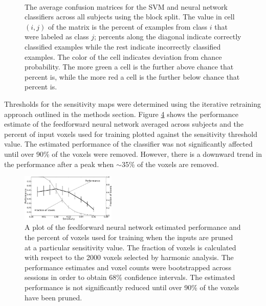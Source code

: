 \documentclass[review,1p,authoryear]{elsarticle}
\begin{document}
\begin{figure}
\centering
\begin{subfigure}{0.3\textwidth}
\centering
\begin{adjustbox}{center}

\end{adjustbox}
\caption{}
\label{fig:average-confusion-svm}
\end{subfigure}
\\
\begin{subfigure}{0.3\textwidth}
\centering
\begin{adjustbox}{center}

\end{adjustbox}
\caption{}
\label{fig:average-confusion-nn}
\end{subfigure}
\caption{The average confusion matrices for the  SVM and  neural network classifiers across all subjects using the block split.
The value in cell $(i,j)$ of the matrix is the percent of examples from class $i$ that were labeled as class $j$; percents along the diagonal indicate correctly classified examples while the rest indicate incorrectly classified examples.
The color of the cell indicates deviation from chance probability.
The more green a cell is the further above chance that percent is, while the more red a cell is the further below chance that percent is.}
\label{fig:average-confusion}
\end{figure}

Thresholds for the sensitivity maps were determined using the iterative retraining approach outlined in the methods section.
Figure \ref{fig:sensitivity-cutoff} shows the performance estimate of the feedforward neural network averaged across subjects and the percent of input voxels used for training plotted against the sensitivity threshold value.
The estimated performance of the classifier was not significantly affected until over 90\% of the voxels were removed.
However, there is a downward trend in the performance after a peak when $\sim$35\% of the voxels are removed.

\begin{figure}
\centering
\includegraphics[width=0.4\textwidth]{figures/performance-verse-sensitivity-cutoff}
\caption{A plot of the feedforward neural network estimated performance and the percent of voxels used for training when the inputs are pruned at a particular sensitivity value.
The fraction of voxels is calculated with respect to the 2000 voxels selected by harmonic analysis.
The performance estimates and voxel counts were bootstrapped across sessions in order to obtain 68\% confidence intervals.
The estimated performance is not significantly reduced until over 90\% of the voxels have been pruned.}
\label{fig:sensitivity-cutoff}
\end{figure}
\end{document}
